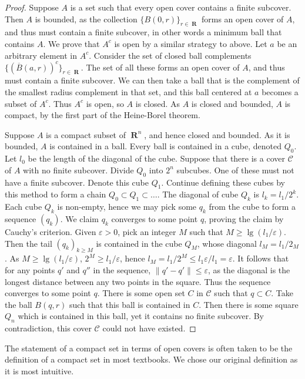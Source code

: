 \documentclass{report}
\DeclareMathOperator{\real}{\mathbf{R}}
\begin{document}
\begin{proof}
  Suppose $A$ is a set such that every open cover contains a finite subcover. Then $A$ is bounded, as the collection $\{B(0,r)\}_{r \in \real}$ forms an open cover of $A$, and thus must contain a finite subcover, in other words a minimum ball that contains $A$. We prove that $A^c$ is open by a similar strategy to above. Let $a$ be an arbitrary element in $A^c$. Consider the set of closed ball complements $\{(\overline{B}(a,r))^c\}_{r \in \real}$. The set of all these forms an open cover of $A$, and thus must contain a finite subcover. We can then take a ball that is the complement of the smallest radius complement in that set, and this ball centered at $a$ becomes a subset of $A^c$. Thus $A^c$ is open, so $A$ is closed. As $A$ is closed and bounded, $A$ is compact, by the first part of the Heine-Borel theorem.

  Suppose $A$ is a compact subset of $\real^n$, and hence closed and bounded. As it is bounded, $A$ is contained in a ball. Every ball is contained in a cube, denoted $Q_0$. Let $l_0$ be the length of the diagonal of the cube. Suppose that there is a cover $\mathcal{C}$ of $A$ with no finite subcover. Divide $Q_0$ into $2^n$ subcubes. One of these must not have a finite subcover. Denote this cube $Q_1$. Continue defining these cubes by this method to form a chain $Q_0 \subset Q_1 \subset \dots$. The diagonal of cube $Q_k$ is $l_k = l_1/2^k$. Each cube $Q_k$ is non-empty, hence we may pick some $q_k$ from the cube to form a sequence $(q_k)$. We claim $q_k$ converges to some point $q$, proving the claim by Cauchy's criterion. Given $\varepsilon > 0$, pick an integer $M$ such that $M \geq \lg(l_1/\varepsilon)$. Then the tail $(q_k)_{k \geq M}$ is contained in the cube $Q_M$, whose diagonal $l_M = l_1/2_M$. As $M \geq \lg(l_1/\varepsilon)$, $2^M \geq l_1/\varepsilon$, hence $l_M = l_1/2^M \leq l_1 \varepsilon/l_1 = \varepsilon$. It follows that for any points $q'$ and $q''$ in the sequence, $\| q' - q' \| \leq \varepsilon$, as the diagonal is the longest distance between any two points in the square. Thus the sequence converges to some point $q$. There is some open set $C$ in $\mathcal{C}$ such that $q \subset C$. Take the ball $B(q,r)$ such that this ball is contained in $C$. Then there is some square $Q_n$ which is contained in this ball, yet it contains no finite subcover. By contradiction, this cover $\mathcal{C}$ could not have existed.
\end{proof}

The statement of a compact set in terms of open covers is often taken to be the definition of a compact set in most textbooks. We chose our original definition as it is most intuitive.
\end{document}
